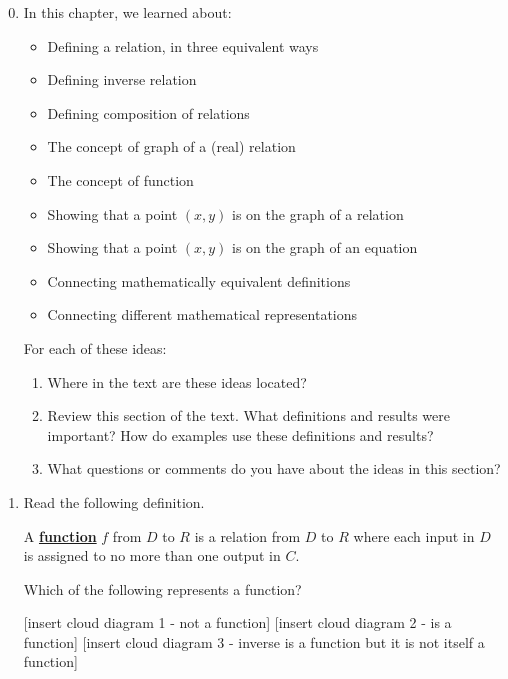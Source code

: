 \documentclass[11pt]{article}
\renewcommand\emph[1]{\underline{\bf{#1}}} %
\theoremstyle{definition}
\begin{document}
\begin{enumerate}
\setcounter{enumi}{-1}
\item In this chapter, we learned about:
 	\begin{itemize}
	\item Defining a relation, in three equivalent ways
	\item Defining inverse relation
	\item Defining composition of relations
	\item The concept of graph of a (real) relation
	\item The concept of function
	\item Showing that a point $(x,y)$ is on the graph of a relation
	\item Showing that a point $(x,y)$ is on the graph of an equation
	\item Connecting mathematically equivalent definitions
	\item Connecting different mathematical representations
	\end{itemize}

For each of these ideas: 
	\begin{enumerate}
	\item Where in the text are these ideas located?
	\item Review this section of the text. What definitions and results were important? How do examples use these definitions and results?
	\item What questions or comments do you have about the ideas in this section?
	\end{enumerate}

	
\item Read the following definition. 

A \emph{function} $f$ from $D$ to $R$ is a relation from $D$ to $R$ where each input in $D$ is assigned to no more than one output in $C$.

Which of the following represents a function?

[insert cloud diagram 1 - not a function] [insert cloud diagram 2 - is a function] [insert cloud diagram 3 - inverse is a function but it is not itself a function]


\end{enumerate}
\end{document}

